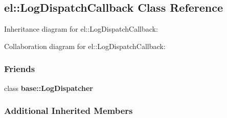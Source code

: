 \hypertarget{a00043}{}\subsection{el\+:\+:Log\+Dispatch\+Callback Class Reference}
\label{a00043}


Inheritance diagram for el\+:\+:Log\+Dispatch\+Callback\+:


Collaboration diagram for el\+:\+:Log\+Dispatch\+Callback\+:
\subsubsection*{Friends}
\begin{DoxyCompactItemize}
\item 
\hypertarget{a00043_a84d22f9ad5b796e49ff5f15a8c32773d}{}class {\bfseries base\+::\+Log\+Dispatcher}\label{a00043_a84d22f9ad5b796e49ff5f15a8c32773d}

\end{DoxyCompactItemize}
\subsubsection*{Additional Inherited Members}
